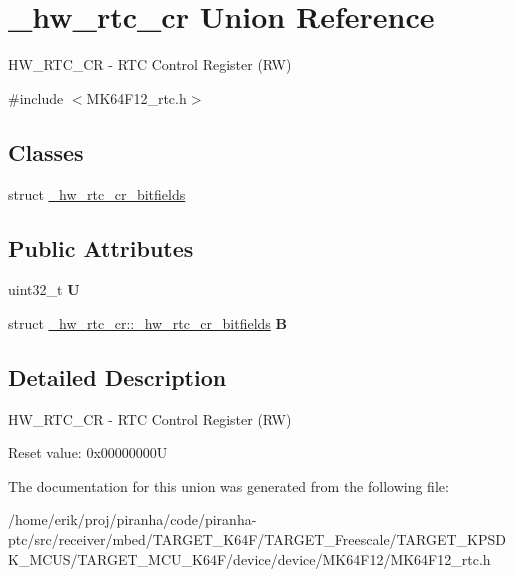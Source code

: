 \hypertarget{union__hw__rtc__cr}{}\section{\+\_\+hw\+\_\+rtc\+\_\+cr Union Reference}
\label{union__hw__rtc__cr}


H\+W\+\_\+\+R\+T\+C\+\_\+\+CR -\/ R\+TC Control Register (RW)  




{\ttfamily \#include $<$M\+K64\+F12\+\_\+rtc.\+h$>$}

\subsection*{Classes}
\begin{DoxyCompactItemize}
\item 
struct \hyperlink{struct__hw__rtc__cr_1_1__hw__rtc__cr__bitfields}{\+\_\+hw\+\_\+rtc\+\_\+cr\+\_\+bitfields}
\end{DoxyCompactItemize}
\subsection*{Public Attributes}
\begin{DoxyCompactItemize}
\item 
uint32\+\_\+t {\bfseries U}\hypertarget{union__hw__rtc__cr_a45579985d60d466d363f3ebd1219b3ec}{}\label{union__hw__rtc__cr_a45579985d60d466d363f3ebd1219b3ec}

\item 
struct \hyperlink{struct__hw__rtc__cr_1_1__hw__rtc__cr__bitfields}{\+\_\+hw\+\_\+rtc\+\_\+cr\+::\+\_\+hw\+\_\+rtc\+\_\+cr\+\_\+bitfields} {\bfseries B}\hypertarget{union__hw__rtc__cr_a63eb7372dc65f04b2fe16a4af5ab5dbf}{}\label{union__hw__rtc__cr_a63eb7372dc65f04b2fe16a4af5ab5dbf}

\end{DoxyCompactItemize}


\subsection{Detailed Description}
H\+W\+\_\+\+R\+T\+C\+\_\+\+CR -\/ R\+TC Control Register (RW) 

Reset value\+: 0x00000000U 

The documentation for this union was generated from the following file\+:\begin{DoxyCompactItemize}
\item 
/home/erik/proj/piranha/code/piranha-\/ptc/src/receiver/mbed/\+T\+A\+R\+G\+E\+T\+\_\+\+K64\+F/\+T\+A\+R\+G\+E\+T\+\_\+\+Freescale/\+T\+A\+R\+G\+E\+T\+\_\+\+K\+P\+S\+D\+K\+\_\+\+M\+C\+U\+S/\+T\+A\+R\+G\+E\+T\+\_\+\+M\+C\+U\+\_\+\+K64\+F/device/device/\+M\+K64\+F12/M\+K64\+F12\+\_\+rtc.\+h\end{DoxyCompactItemize}
